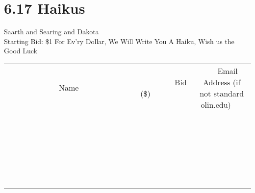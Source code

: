 \documentclass[11pt]{article}
\begin{document}
\section*{6.17 Haikus}
Saarth and Searing and Dakota
\\
Starting Bid: \$1
\newline
For Ev'ry Dollar,
We Will Write You A Haiku,
Wish us the Good Luck
\\[6ex]
\begin{tabular}{c c c}
~~~~~~~~~~~~~Name~~~~~~~~~~~~~ & ~~~~~~~~~Bid (\$)~~~~~~~~~  & ~~~Email Address (if not standard olin.edu)~~~\\
 & & \\
\hline
 & & \\
\hline
 & & \\
\hline
 & & \\
\hline
 & & \\
\hline
 & & \\
\hline
 & & \\
\hline
 & & \\
\hline
 & & \\
\hline
 & & \\
\hline
 & & \\
\hline
 & & \\
\hline
 & & \\
\hline
 & & \\
\hline
 & & \\
\hline
 & & \\
\hline
 & & \\
\hline
 & & \\
\hline
 & & \\
\hline
 & & \\
\hline
 & & \\
\hline
 & & \\
\hline
 & & \\
\hline
 & & \\
\hline
 & & \\
\hline
 & & \\
\hline
\end{tabular}
\newpage
\end{document}
